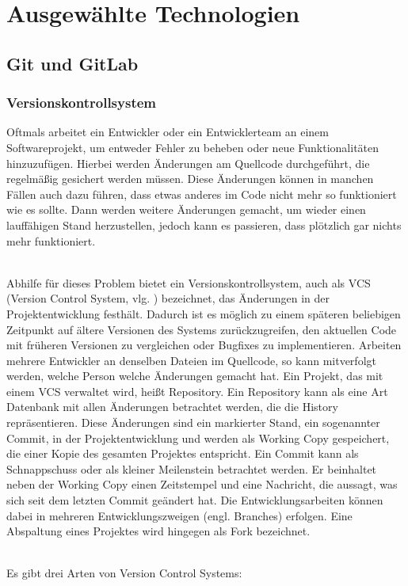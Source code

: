 \chapter{Ausgewählte Technologien}
\section{Git und GitLab}

\subsection{Versionskontrollsystem}
Oftmals arbeitet ein Entwickler oder ein Entwicklerteam an einem Softwareprojekt, um entweder Fehler zu beheben oder neue Funktionalitäten hinzuzufügen. Hierbei werden Änderungen am Quellcode durchgeführt, die regelmäßig gesichert werden müssen. Diese Änderungen können in manchen Fällen auch dazu führen, dass etwas anderes im Code nicht mehr so funktioniert wie es sollte. Dann werden weitere Änderungen gemacht, um wieder einen lauffähigen Stand herzustellen, jedoch kann es passieren, dass plötzlich gar nichts mehr funktioniert.

\mbox{}\\Abhilfe für dieses Problem bietet ein Versionskontrollsystem, auch als VCS (Version Control System, vlg. \cite{vcs_2019}) bezeichnet, das Änderungen in der Projektentwicklung festhält. Dadurch ist es möglich zu einem späteren beliebigen Zeitpunkt auf ältere Versionen des Systems zurückzugreifen, den aktuellen Code mit früheren Versionen zu vergleichen oder Bugfixes zu implementieren. Arbeiten mehrere Entwickler an denselben Dateien im Quellcode, so kann mitverfolgt werden, welche Person welche Änderungen gemacht hat. Ein Projekt, das mit einem VCS verwaltet wird, heißt Repository. Ein Repository kann als eine Art Datenbank mit allen Änderungen betrachtet werden, die die History repräsentieren. Diese Änderungen sind ein markierter Stand, ein sogenannter Commit, in der Projektentwicklung und werden als Working Copy gespeichert, die einer Kopie des gesamten Projektes entspricht. Ein Commit kann als Schnappschuss oder als kleiner Meilenstein betrachtet werden. Er beinhaltet neben der Working Copy einen Zeitstempel und eine Nachricht, die aussagt, was sich seit dem letzten Commit geändert hat. Die Entwicklungsarbeiten können dabei in mehreren Entwicklungszweigen (engl. Branches) erfolgen. Eine Abspaltung eines Projektes wird hingegen als Fork bezeichnet.

\mbox{}\\Es gibt drei Arten von Version Control Systems:

